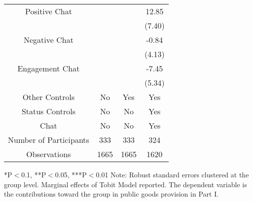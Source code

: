 \begin{table}[htbp]
\begin{tabular}{c c c c}
Positive Chat                        &                     &                       &  12.85\sym{*}  \\
                                 &                     &                           &  (7.40)  \\
Negative  Chat                       &                     &                       &  -0.84  \\
                                 &                     &                           &  (4.13)  \\
Engagement Chat                      &                     &                       &  -7.45  \\
                                 &                     &                           &  (5.34)  \\
\midrule
Other Controls                   &    No               &    Yes                    &    Yes        \\
Status Controls                    &    No               &    No                   &    Yes        \\
Chat                             &    No               &    No                     &    Yes        \\
\midrule
Number of Participants           &    333               &    333                   &    324        \\
\midrule
Observations                     &       1665          &       1665                &  1620    \\
\bottomrule
\end{tabular}
\begin{footnotesize}
\newline
*P$<$0.1, **P$<$0.05, ***P$<$0.01
\newline
Note: Robust standard errors clustered at the group level. Marginal effects of Tobit Model reported.
\newline
The dependent variable is the contributions toward the group in public goods provision in Part I. \\
\end{footnotesize}
\end{table}

